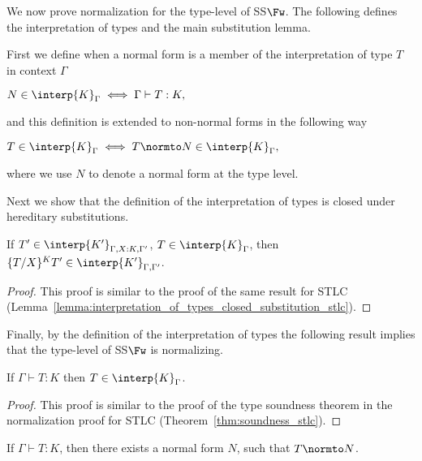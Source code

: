 We now prove normalization for the type-level of SS$\Fw$.  The
following defines the interpretation of types and the main
substitution lemma.

\begin{definition}
  \label{def:interpretation_of_types_ssfw}
  First we define when a normal form is a member of the interpretation of type $T$ in context $\Gamma$
  \begin{center}
    \begin{math}
      N \in \interp{K}_\Gamma \iff \Gamma \vdash T:K,
  \end{math}
  \end{center}
  and this definition is extended to non-normal forms in the following way
  \begin{center}
    \begin{math}
      T \in \interp{K}_\Gamma \iff T \normto N \in \interp{K}_\Gamma,
  \end{math}
  \end{center}
 where we use $N$ to denote a normal form at the type level.
\end{definition}

\noindent 
Next we show that the definition of the interpretation of types is closed under
hereditary substitutions.  

\begin{lemma}
  If $T' \in \interp{K'}_{\Gamma,X:K,\Gamma'}$, $T \in \interp{K}_\Gamma$, then 
  $\{T/X\}^K T' \in \interp{K'}_{\Gamma,\Gamma'}$.
  
  \label{lemma:interpretation_of_types_closed_substitution_ssfw}
\end{lemma}
\begin{proof}
  This proof is similar to the proof of the same result for STLC
  (Lemma~\ref{lemma:interpretation_of_types_closed_substitution_stlc}).
\end{proof}
\noindent
Finally, by the definition of the interpretation of types the following result implies that the type-level
of SS$\Fw$ is normalizing.
\begin{thm}
  If $\Gamma \vdash T:K$ then $T \in \interp{K}_\Gamma$.
  \label{thm:soundness_ssfw}
\end{thm}
\begin{proof}
  This proof is similar to the proof of the type soundness theorem in
  the normalization proof for STLC (Theorem~\ref{thm:soundness_stlc}).
\end{proof}
\begin{corollary}
  \label{coro:normalization_type_level_ssfw}
  If $\Gamma \vdash T:K$, then there exists a normal form $N$,
  such that $T \normto N$.
\end{corollary}

